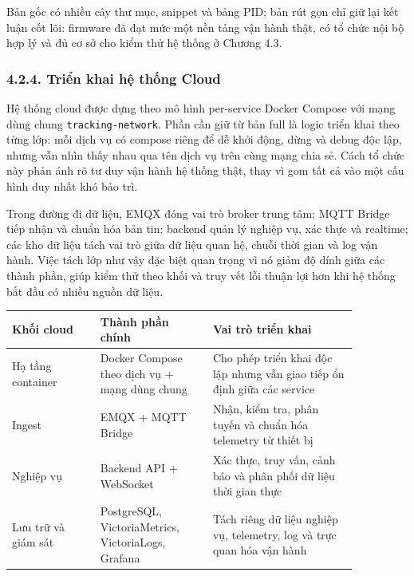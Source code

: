 \documentclass[a4paper]{extarticle}
\begin{document}
Bản gốc có nhiều cây thư mục, snippet và bảng PID; bản rút gọn chỉ giữ lại kết luận cốt lõi: firmware đã đạt mức một nền tảng vận hành thật, có tổ chức nội bộ hợp lý và đủ cơ sở cho kiểm thử hệ thống ở Chương 4.3.

\subsubsection{4.2.4. Triển khai hệ thống Cloud}\label{424-triux1ec3n-khai-hux1ec7-thux1ed1ng-cloud}

Hệ thống cloud được dựng theo mô hình per-service Docker Compose với mạng dùng chung \texttt{tracking-network}. Phần cần giữ từ bản full là logic triển khai theo từng lớp: mỗi dịch vụ có compose riêng để dễ khởi động, dừng và debug độc lập, nhưng vẫn nhìn thấy nhau qua tên dịch vụ trên cùng mạng chia sẻ. Cách tổ chức này phản ánh rõ tư duy vận hành hệ thống thật, thay vì gom tất cả vào một cấu hình duy nhất khó bảo trì.

Trong đường đi dữ liệu, EMQX đóng vai trò broker trung tâm; MQTT Bridge tiếp nhận và chuẩn hóa bản tin; backend quản lý nghiệp vụ, xác thực và realtime; các kho dữ liệu tách vai trò giữa dữ liệu quan hệ, chuỗi thời gian và log vận hành. Việc tách lớp như vậy đặc biệt quan trọng vì nó giảm độ dính giữa các thành phần, giúp kiểm thử theo khối và truy vết lỗi thuận lợi hơn khi hệ thống bắt đầu có nhiều nguồn dữ liệu.

\begin{center}
\begin{tabular}{|p{0.22\linewidth}|p{0.28\linewidth}|p{0.36\linewidth}|}
\hline
\textbf{Khối cloud} & \textbf{Thành phần chính} & \textbf{Vai trò triển khai} \\
\hline
Hạ tầng container & Docker Compose theo dịch vụ + mạng dùng chung & Cho phép triển khai độc lập nhưng vẫn giao tiếp ổn định giữa các service \\
\hline
Ingest & EMQX + MQTT Bridge & Nhận, kiểm tra, phân tuyến và chuẩn hóa telemetry từ thiết bị \\
\hline
Nghiệp vụ & Backend API + WebSocket & Xác thực, truy vấn, cảnh báo và phân phối dữ liệu thời gian thực \\
\hline
Lưu trữ và giám sát & PostgreSQL, VictoriaMetrics, VictoriaLogs, Grafana & Tách riêng dữ liệu nghiệp vụ, telemetry, log và trực quan hóa vận hành \\
\hline
\end{tabular}
\end{center}
\end{document}
